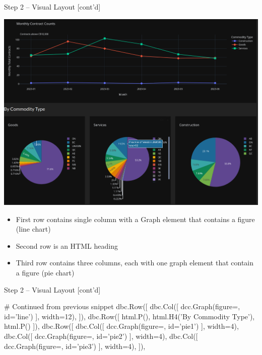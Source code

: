 \documentclass[ignorenonframetext,xcolor=x11names]{beamer}
\begin{document}
\begin{frame}{Step 2 -- Visual Layout \small [cont'd]}
\begin{center}
  \includegraphics[width=.6\textwidth]{dashboard2.png}
\end{center}
\small
\begin{itemize}
  \item First row contains single column with a Graph element that contains a figure (line chart)
  \item Second row is an HTML heading
  \item Third row contains three columns, each with one graph element that contain a figure (pie chart)
\end{itemize}
\end{frame}

\begin{frame}[fragile]{Step 2 -- Visual Layout \small [cont'd]}
\begin{pythoncode}
# Continued from previous snippet
   dbc.Row([
        dbc.Col([
            dcc.Graph(figure={}, id='line')
        ], width=12),
    ]),
    dbc.Row([
        html.P(),
        html.H4('By Commodity Type'),
        html.P()
    ]),
    dbc.Row([
        dbc.Col([
            dcc.Graph(figure={}, id='pie1')
        ], width=4),
        dbc.Col([
            dcc.Graph(figure={}, id='pie2')
        ], width=4),
        dbc.Col([
            dcc.Graph(figure={}, id='pie3')
        ], width=4),
    ]),
\end{pythoncode}
\end{frame}
\end{document}
